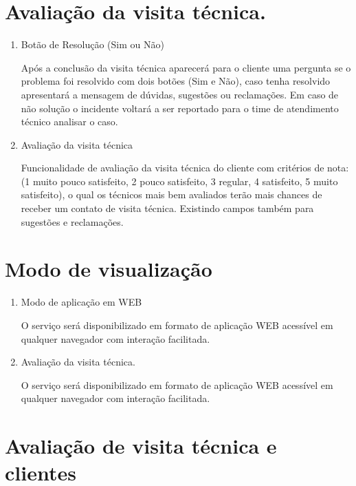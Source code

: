 \documentclass[
    12pt,               %
    openright,          %
    oneside,
    a4paper,            %
    english,            %
    brazil              %
   ]{ifsp-spo-inf-ctds}
\begin{document}
\section{Avaliação da visita técnica.}

	\begin{enumerate}
		
		\item
		Botão de Resolução (Sim ou Não)
		
		Após a conclusão da visita técnica aparecerá para o cliente uma pergunta se o problema foi resolvido com dois botões (Sim e Não), caso tenha resolvido apresentará a mensagem de dúvidas, sugestões ou reclamações. Em caso de não solução o incidente voltará a ser reportado para o time de atendimento técnico analisar o caso. 
		
		\item
		Avaliação da visita técnica
		
		Funcionalidade de avaliação da visita técnica do cliente com critérios de nota:(1 muito pouco satisfeito, 2 pouco satisfeito, 3 regular, 4 satisfeito, 5 muito satisfeito), o qual os técnicos mais bem avaliados terão mais chances de receber um contato de visita técnica. Existindo campos também para sugestões e reclamações.
		
	\end{enumerate}

\section{Modo de visualização}

	\begin{enumerate}
	
		\item
		Modo de aplicação em WEB
		
		O serviço será disponibilizado em formato de aplicação WEB acessível em qualquer navegador com interação facilitada.
		
		\item
		Avaliação da visita técnica.
		
		O serviço será disponibilizado em formato de aplicação WEB acessível em qualquer navegador com interação facilitada.
		
	\end{enumerate}

\section{Avaliação de visita técnica e clientes}
\end{document}
